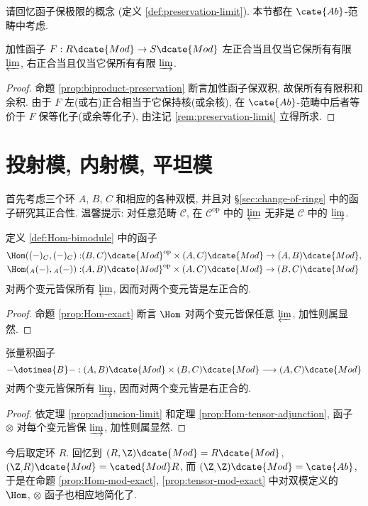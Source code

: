 请回忆函子保极限的概念 (定义 \ref{def:preservation-limit}). 本节都在 $\cate{Ab}$-范畴中考虑.
\begin{proposition}
	加性函子 $F: R\dcate{Mod} \to S\dcate{Mod}$ 左正合当且仅当它保所有有限 $\varprojlim$, 右正合当且仅当它保所有有限 $\varinjlim$.
\end{proposition}
\begin{proof}
	命题 \ref{prop:biproduct-preservation} 断言加性函子保双积, 故保所有有限积和余积. 由于 $F$ 左(或右)正合相当于它保持核(或余核), 在 $\cate{Ab}$-范畴中后者等价于 $F$ 保等化子(或余等化子), 由注记 \ref{rem:preservation-limit} 立得所求.
\end{proof}

\section{投射模, 内射模, 平坦模}
首先考虑三个环 $A$, $B$, $C$ 和相应的各种双模, 并且对 \S\ref{sec:change-of-rings} 中的函子研究其正合性. 温馨提示: 对任意范畴 $\mathcal{C}$, 在 $\mathcal{C}^\text{op}$ 中的 $\varprojlim$ 无非是 $\mathcal{C}$ 中的 $\varinjlim$.
\begin{proposition}\label{prop:Hom-mod-exact}
	定义 \ref{def:Hom-bimodule} 中的函子
	\begin{align*}
		\Hom((-)_C, (-)_C): & (B,C)\dcate{Mod}^\text{op} \times (A,C)\dcate{Mod} \to (A,B)\dcate{Mod}, \\
		\Hom({}_A (-), {}_A(-)): & (A,B)\dcate{Mod}^\text{op} \times (A,C)\dcate{Mod} \to (B,C)\dcate{Mod}
	\end{align*}
	对两个变元皆保所有 $\varprojlim$, 因而对两个变元皆是左正合的.
\end{proposition}
\begin{proof}
	命题 \ref{prop:Hom-exact} 断言 $\Hom$ 对两个变元皆保任意 $\varprojlim$, 加性则属显然.
\end{proof}

\begin{proposition}\label{prop:tensor-mod-exact}
	张量积函子
	\[ - \dotimes{B} -: (A,B)\dcate{Mod} \times (B,C)\dcate{Mod} \longrightarrow (A,C)\dcate{Mod} \]
	对两个变元皆保所有 $\varinjlim$, 因而对两个变元皆是右正合的.
\end{proposition}
\begin{proof}
	依定理 \ref{prop:adjuncion-limit} 和定理 \ref{prop:Hom-tensor-adjunction}, 函子 $\otimes$ 对每个变元皆保 $\varinjlim$, 加性则属显然.
\end{proof}

今后取定环 $R$. 回忆到 $(R, \Z)\dcate{Mod} = R\dcate{Mod}$, $(\Z_, R)\dcate{Mod} = \cated{Mod}R$, 而 $(\Z_, \Z)\dcate{Mod} = \cate{Ab}$, 于是在命题 \ref{prop:Hom-mod-exact}, \ref{prop:tensor-mod-exact} 中对双模定义的 $\Hom$, $\otimes$ 函子也相应地简化了.


